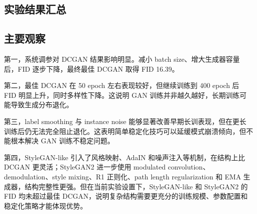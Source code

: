 \documentclass[UTF8,a4paper,12pt]{ctexart}
\begin{document}
\subsection{实验结果汇总}

\begin{table}[H]
\centering
\caption{主要实验结果汇总}
\label{tab:summary}
\end{table}

\subsection{主要观察}

第一，系统调参对 DCGAN 结果影响明显。减小 batch size、增大生成器容量后，FID 逐步下降，最终最佳 DCGAN 取得 FID 16.39。

第二，最佳 DCGAN 在 50 epoch 左右表现较好，但继续训练到 400 epoch 后 FID 明显上升，同时多样性下降。这说明 GAN 训练并非越久越好，长期训练可能导致生成分布退化。

第三，label smoothing 与 instance noise 能够显著改善早期长训表现，但在更长训练后仍无法完全阻止退化。这表明简单稳定化技巧可以延缓模式崩溃倾向，但不能根本解决 GAN 训练不稳定问题。

第四，StyleGAN-like 引入了风格映射、AdaIN 和噪声注入等机制，在结构上比 DCGAN 更灵活；StyleGAN2 进一步使用 modulated convolution、demodulation、style mixing、R1 正则化、path length regularization 和 EMA 生成器，结构完整性更强。但在当前实验设置下，StyleGAN-like 和 StyleGAN2 的 FID 均未超过最佳 DCGAN，说明复杂结构需要更充分的训练规模、参数配置和稳定化策略才能体现优势。
\end{document}
